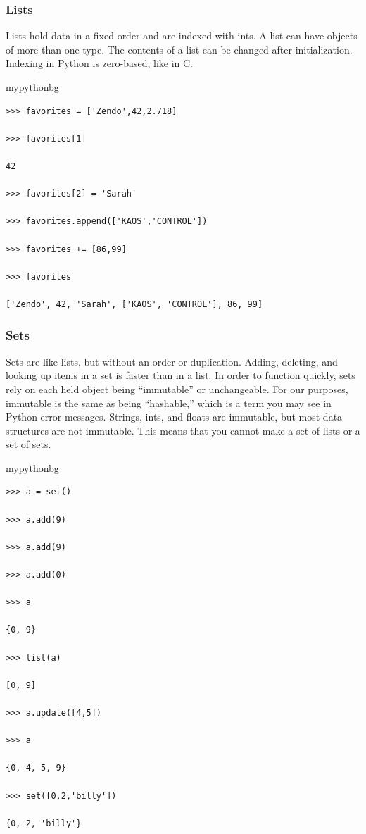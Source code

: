 \subsubsection{Lists}
Lists hold data in a fixed order and are indexed with ints.
A list can have objects of more than one type.
The contents of a list can be changed after initialization.
Indexing in Python is zero-based, like in C.
\begin{tsession}{mypythonbg}
\begin{verbatim}
>>> favorites = ['Zendo',42,2.718]

>>> favorites[1]

42

>>> favorites[2] = 'Sarah'

>>> favorites.append(['KAOS','CONTROL'])

>>> favorites += [86,99]

>>> favorites

['Zendo', 42, 'Sarah', ['KAOS', 'CONTROL'], 86, 99]
\end{verbatim}
\end{tsession}

\subsubsection{Sets}

Sets are like lists, but without an order or duplication.
Adding, deleting, and looking up items in a set is faster than in a list.
In order to function quickly, sets rely on each held object being ``immutable'' or unchangeable.
For our purposes, immutable is the same as being ``hashable,'' which is a term you may see in Python error messages.
Strings, ints, and floats are immutable, but most data structures are not immutable.
This means that you cannot make a set of lists or a set of sets.
\begin{tsession}{mypythonbg}
\begin{verbatim}
>>> a = set()

>>> a.add(9)

>>> a.add(9)

>>> a.add(0)

>>> a

{0, 9}

>>> list(a)

[0, 9]

>>> a.update([4,5])

>>> a

{0, 4, 5, 9}

>>> set([0,2,'billy'])

{0, 2, 'billy'}
\end{verbatim}
\end{tsession}

